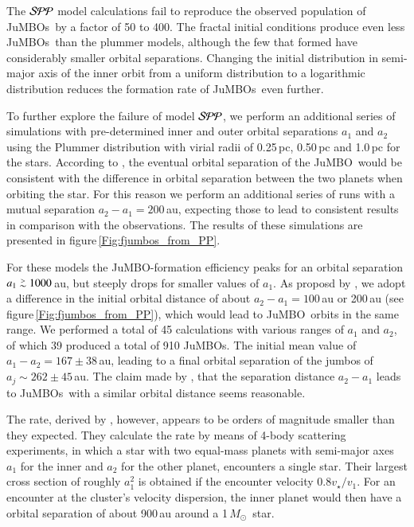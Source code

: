 \documentclass[aa]{lib/aa}
\newcommand{\MSun}{\mbox{${M}_\odot$}}
\def\apgt{\ {\raise-.5ex\hbox{$\buildrel>\over\sim$}}\ }
\newcommand{\jumbo}{\mbox{JuMBO}}
\newcommand{\jumbos}{\mbox{JuMBOs}}
\begin{document}
The ${\cal SPP}$ model calculations fail to reproduce the observed
population of \jumbos\, by a factor of 50 to 400.  The fractal initial
conditions produce even less \jumbos\, than the plummer models,
although the few that formed have considerably smaller orbital
separations.  Changing the initial distribution in semi-major axis of
the inner orbit from a uniform distribution to a logarithmic
distribution reduces the formation rate of \jumbos\, even further.

To further explore the failure of model ${\cal SPP}$, we perform an
additional series of simulations with pre-determined inner and outer
orbital separations $a_1$ and $a_2$ using the Plummer distribution
with virial radii of 0.25\,pc, 0.50\,pc and 1.0\,pc for the stars.
According to \cite{2023arXiv231006016W}, the eventual orbital
separation of the \jumbo\, would be consistent with the difference in
orbital separation between the two planets when orbiting the star. For
this reason we perform an additional series of runs with a mutual
separation $a_2-a_1 = 200$\,au, expecting those to lead to consistent
results in comparison with the observations.  The results of these
simulations are presented in figure\,\ref{Fig:fjumbos_from_PP}.

For these models the \jumbo-formation efficiency peaks for an orbital
separation $a_1 \apgt 1000$\,au, but steeply drops for smaller values
of $a_1$. As proposd by \cite{2023arXiv231006016W}, we adopt a
difference in the initial orbital distance of about $a_2-a_1 =
100$\,au or 200\,au (see figure\,\ref{Fig:fjumbos_from_PP}), which
would lead to \jumbo\, orbits in the same range.  We performed a total
of 45 calculations with various ranges of $a_1$ and $a_2$, of which 39
produced a total of 910 \jumbos. The initial mean value of $a_1-a_2 =
167\pm38$\,au, leading to a final orbital separation of the jumbos of
$a_j \sim 262\pm45$\,au.  The claim made by
\cite{2023arXiv231006016W}, that the separation distance $a_2-a_1$
leads to \jumbos\, with a similar orbital distance seems reasonable.

The rate, derived by \cite{2023arXiv231006016W}, however, appears to
be orders of magnitude smaller than they expected.  They calculate the
rate by means of 4-body scattering experiments, in which a star with
two equal-mass planets with semi-major axes $a_1$ for the inner and
$a_2$ for the other planet, encounters a single star. Their largest
cross section of roughly $a_1^2$ is obtained if the encounter velocity
$0.8v_\star/v_1$. For an encounter at the cluster's velocity
dispersion, the inner planet would then have a orbital separation of
about 900\,au around a 1\,\MSun\, star.
\end{document}
